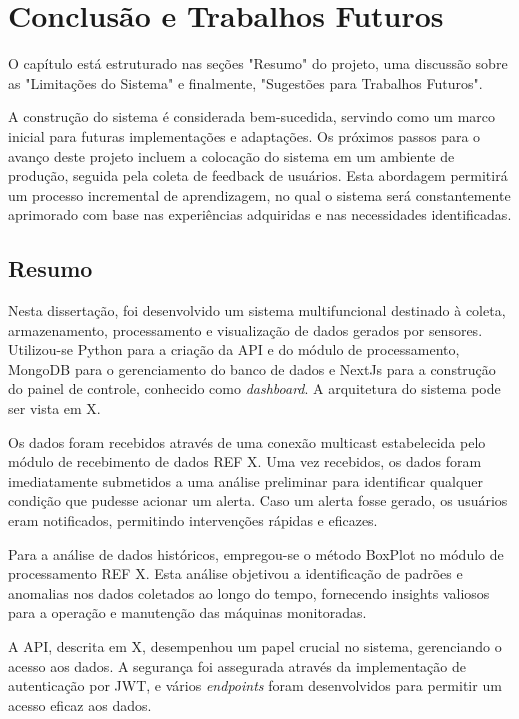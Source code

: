 \chapter{Conclusão e Trabalhos Futuros}\label{chap:conclusion_and_future_work}

O capítulo está estruturado nas seções "Resumo" do projeto, uma discussão sobre as "Limitações do Sistema" e finalmente, "Sugestões para Trabalhos Futuros". 

A construção do sistema é considerada bem-sucedida, servindo como um marco inicial para futuras implementações e adaptações. Os próximos passos para o avanço deste projeto incluem a colocação do sistema em um ambiente de produção, seguida pela coleta de feedback de usuários. Esta abordagem permitirá um processo incremental de aprendizagem, no qual o sistema será constantemente aprimorado com base nas experiências adquiridas e nas necessidades identificadas. 

\section{Resumo}\label{sec:summary}
Nesta dissertação, foi desenvolvido um sistema multifuncional destinado à coleta, armazenamento, processamento e visualização de dados gerados por sensores. Utilizou-se Python para a criação da \gls{API} e do módulo de processamento, MongoDB para o gerenciamento do banco de dados e NextJs para a construção do painel de controle, conhecido como \emph{dashboard}. A arquitetura do sistema pode ser vista em X.

Os dados foram recebidos através de uma conexão multicast estabelecida pelo módulo de recebimento de dados REF X. Uma vez recebidos, os dados foram imediatamente submetidos a uma análise preliminar para identificar qualquer condição que pudesse acionar um alerta. Caso um alerta fosse gerado, os usuários eram notificados, permitindo intervenções rápidas e eficazes.

Para a análise de dados históricos, empregou-se o método BoxPlot no módulo de processamento REF X. Esta análise objetivou a identificação de padrões e anomalias nos dados coletados ao longo do tempo, fornecendo insights valiosos para a operação e manutenção das máquinas monitoradas.

A \gls{API}, descrita em X, desempenhou um papel crucial no sistema, gerenciando o acesso aos dados. A segurança foi assegurada através da implementação de autenticação por \gls{JWT}, e vários \emph{endpoints} foram desenvolvidos para permitir um acesso eficaz aos dados.

